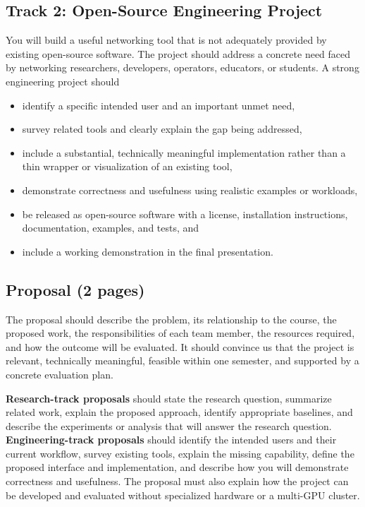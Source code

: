\documentclass[11pt]{article}
\begin{document}
\subsection{Track 2: Open-Source Engineering Project}
You will build a useful networking tool that is not adequately provided by
existing open-source software. The project should address a concrete need faced
by networking researchers, developers, operators, educators, or students. A
strong engineering project should
\begin{itemize}
  \item identify a specific intended user and an important unmet need,
  \item survey related tools and clearly explain the gap being addressed,
  \item include a substantial, technically meaningful implementation rather than a thin wrapper or visualization of an existing tool,
  \item demonstrate correctness and usefulness using realistic examples or workloads,
  \item be released as open-source software with a license, installation instructions, documentation, examples, and tests, and
  \item include a working demonstration in the final presentation.
\end{itemize}

\subsection{Proposal (2 pages)}
The proposal should describe the problem, its relationship to the course, the
proposed work, the responsibilities of each team member, the resources
required, and how the outcome will be evaluated. It should convince us that the
project is relevant, technically meaningful, feasible within one semester, and
supported by a concrete evaluation plan.

\textbf{Research-track proposals} should state the research question, summarize
related work, explain the proposed approach, identify appropriate baselines, and
describe the experiments or analysis that will answer the research question.
\textbf{Engineering-track proposals} should identify the intended users and their
current workflow, survey existing tools, explain the missing capability, define
the proposed interface and implementation, and describe how you will demonstrate
correctness and usefulness. The proposal must also explain how the project can be
developed and evaluated without specialized hardware or a multi-GPU cluster.
\end{document}
